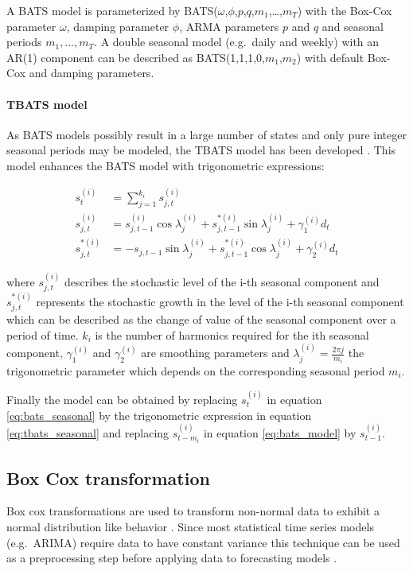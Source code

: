 A BATS model is parameterized by BATS($\omega$,$\phi$,$p$,$q$,$m_1$,\ldots,$m_T$) with the Box-Cox parameter $\omega$, damping parameter $\phi$, ARMA parameters $p$ and $q$ and seasonal periods $m_1,\ldots,m_T$. A double seasonal model (e.g.~daily and weekly) with an AR(1) component can be described as BATS(1,1,1,0,$m_1$,$m_2$) with default Box-Cox and damping parameters. 

\paragraph{TBATS model} As BATS models possibly result in a large number of states and only pure integer seasonal periods may be modeled, the TBATS model has been developed \cite{de2011forecasting}. This model enhances the BATS model with trigonometric expressions:

\begin{align}
	s_t^{(i)} &= \sum_{j=1}^{k_i} s_{j,t}^{(i)}\label{eq:tbats_seasonal} \\
	s_{j,t}^{(i)} &= s_{j,t-1}^{(i)} \cos \lambda_j^{(i)} + s_{j,t-1}^{*(i)} \sin \lambda_j^{(i)} + \gamma_1^{(i)} d_t \\
	s_{j,t}^{*(i)} &= - s_{j,t-1} \sin \lambda_j^{(i)} + s_{j,t-1}^{*(i)} \cos \lambda_j^{(i)} + \gamma_2^{(i)} d_t 
\end{align}

where $s_{j,t}^{(i)}$ describes the stochastic level of the i-th seasonal component and $s_{j,t}^{*(i)}$ represents the stochastic growth in the level of the i-th seasonal component which can be described as the change of value of the seasonal component over a period of time. $k_i$ is the number of harmonics required for the ith seasonal component, $\gamma_1^{(i)}$ and $\gamma_2^{(i)}$ are smoothing parameters and $\lambda_j^{(i)} = \frac{2 \pi j}{m_i}$ the trigonometric parameter which depends on the corresponding seasonal period $m_i$. 

Finally the model can be obtained by replacing $s_t^{(i)}$ in equation \ref{eq:bats_seasonal} by the trigonometric expression in equation \ref{eq:tbats_seasonal} and replacing $s_{t-m_i}^{(i)}$ in equation \ref{eq:bats_model} by $s_{t-1}^{(i)}$. 


\subsection{Box Cox transformation} \label{ssec:box_cox_transformation}

Box cox transformations are used to transform non-normal data to exhibit a normal distribution like behavior \cite{box1964analysis}. Since most statistical time series models (e.g.~ARIMA) require data to have constant variance this technique can be used as a preprocessing step before applying data to forecasting models \cite{nelson1979experience}. 

